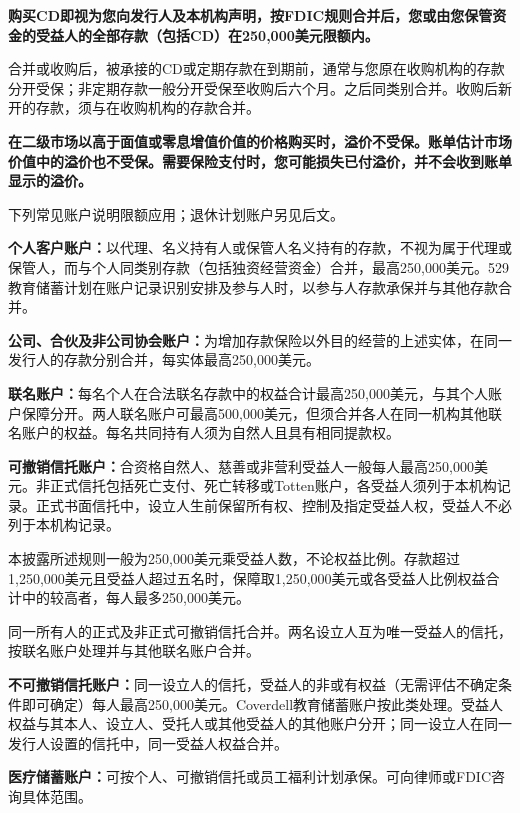 \documentclass[UTF8,fontset=none,11pt,a4paper]{ctexart}
\begin{document}
\textbf{购买CD即视为您向发行人及本机构声明，按FDIC规则合并后，您或由您保管资金的受益人的全部存款（包括CD）在250,000美元限额内。}


合并或收购后，被承接的CD或定期存款在到期前，通常与您原在收购机构的存款分开受保；非定期存款一般分开受保至收购后六个月。之后同类别合并。收购后新开的存款，须与在收购机构的\allowbreak\mbox{存款合并。}


\textbf{在二级市场以高于面值或零息增值价值的价格购买时，溢价不受保。账单估计市场价值中的溢价也不受保。需要保险支付时，您可能损失已付溢价，并不会收到账单显示的溢价。}


下列常见账户说明限额应用；退休计划账户\allowbreak\mbox{另见后文。}


\textbf{个人客户账户：}以代理、名义持有人或保管人名义持有的存款，不视为属于代理或保管人，而与个人同类别存款（包括独资经营资金）合并，最高250,000美元。529教育储蓄计划在账户记录识别安排及参与人时，以参与人存款承保并与其他\allowbreak\mbox{存款合并。}


\textbf{公司、合伙及非公司协会账户：}为增加存款保险以外目的经营的上述实体，在同一发行人的存款分别合并，每实体最高\allowbreak\mbox{250,000美元。}


\textbf{联名账户：}每名个人在合法联名存款中的权益合计最高250,000美元，与其个人账户保障分开。两人联名账户可最高500,000美元，但须合并各人在同一机构其他联名账户的权益。每名共同持有人须为自然人且具有相\allowbreak\mbox{同提款权。}


\textbf{可撤销信托账户：}合资格自然人、慈善或非营利受益人一般每人最高250,000美元。非正式信托包括死亡支付、死亡转移或Totten账户，各受益人须列于本机构记录。正式书面信托中，设立人生前保留所有权、控制及指定受益人权，受益人不必列于本\allowbreak\mbox{机构记录。}


本披露所述规则一般为250,000美元乘受益人数，不论权益比例。存款超过1,250,000美元且受益人超过五名时，保障取1,250,000美元或各受益人比例权益合计中的较高者，每人最多\allowbreak\mbox{250,000美元。}


同一所有人的正式及非正式可撤销信托合并。两名设立人互为唯一受益人的信托，按联名账户处理并与其他联名\allowbreak\mbox{账户合并。}


\textbf{不可撤销信托账户：}同一设立人的信托，受益人的非或有权益（无需评估不确定条件即可确定）每人最高250,000美元。Coverdell教育储蓄账户按此类处理。受益人权益与其本人、设立人、受托人或其他受益人的其他账户分开；同一设立人在同一发行人设置的信托中，同一受益人\allowbreak\mbox{权益合并。}


\textbf{医疗储蓄账户：}可按个人、可撤销信托或员工福利计划承保。可向律师或FDIC咨询\allowbreak\mbox{具体范围。}
\end{document}
